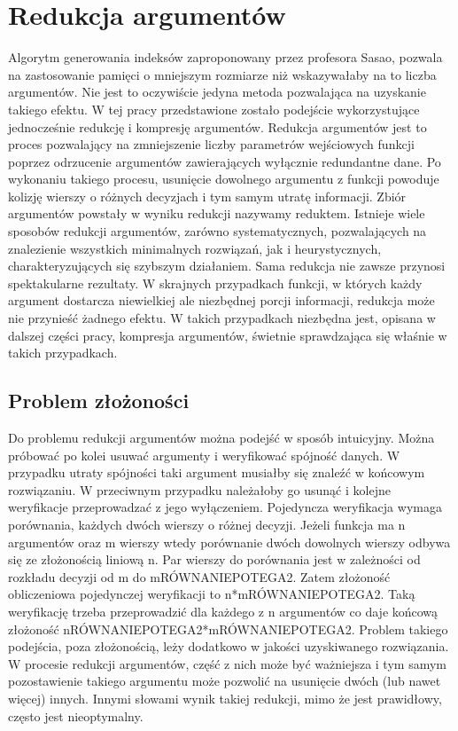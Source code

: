 \chapter{Redukcja argumentów}

Algorytm generowania indeksów zaproponowany przez profesora Sasao, pozwala na zastosowanie pamięci o mniejszym rozmiarze niż wskazywałaby na to liczba argumentów. Nie jest to oczywiście jedyna metoda pozwalająca na  uzyskanie takiego efektu. W tej pracy przedstawione zostało podejście wykorzystujące jednocześnie redukcję i kompresję argumentów.
Redukcja argumentów jest to proces pozwalający na zmniejszenie liczby parametrów wejściowych funkcji poprzez odrzucenie argumentów zawierających wyłącznie redundantne dane. Po wykonaniu takiego procesu, usunięcie dowolnego argumentu z funkcji powoduje kolizję wierszy o różnych decyzjach i tym samym utratę informacji. Zbiór argumentów powstały w wyniku redukcji nazywamy reduktem. Istnieje wiele sposobów redukcji argumentów, zarówno systematycznych, pozwalających na znalezienie wszystkich minimalnych rozwiązań, jak i heurystycznych, charakteryzujących się szybszym działaniem.
Sama redukcja nie zawsze przynosi spektakularne rezultaty. W skrajnych przypadkach funkcji, w których każdy argument dostarcza niewielkiej ale niezbędnej porcji informacji, redukcja może nie przynieść żadnego efektu. W takich przypadkach niezbędna jest, opisana w dalszej części pracy, kompresja argumentów, świetnie sprawdzająca się właśnie w takich przypadkach.

\section{Problem złożoności}

Do problemu redukcji argumentów można podejść w sposób intuicyjny. Można próbować po kolei usuwać argumenty i weryfikować spójność danych. W przypadku utraty spójności taki argument musiałby się znaleźć w końcowym rozwiązaniu. W przeciwnym przypadku należałoby go usunąć i kolejne weryfikacje przeprowadzać z jego wyłączeniem.
Pojedyncza weryfikacja wymaga porównania, każdych dwóch wierszy o różnej decyzji. Jeżeli funkcja ma n argumentów oraz m wierszy wtedy porównanie dwóch dowolnych wierszy odbywa się ze złożonością liniową n. Par wierszy do porównania jest w zależności od rozkładu decyzji od m do mRÓWNANIEPOTEGA2. Zatem złożoność obliczeniowa pojedynczej weryfikacji to n*mRÓWNANIEPOTEGA2. Taką weryfikację trzeba przeprowadzić dla każdego z n argumentów co daje końcową złożoność nRÓWNANIEPOTEGA2*mRÓWNANIEPOTEGA2.
Problem takiego podejścia, poza złożonością, leży dodatkowo w jakości uzyskiwanego rozwiązania. W procesie redukcji argumentów, część z nich może być ważniejsza i tym samym pozostawienie takiego argumentu może pozwolić na usunięcie dwóch (lub nawet więcej) innych. Innymi słowami wynik takiej redukcji, mimo że jest prawidłowy, często jest nieoptymalny.

